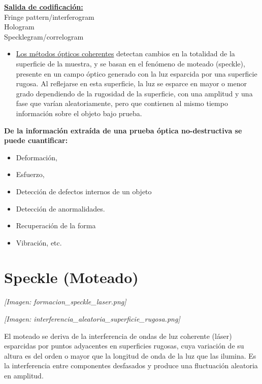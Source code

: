 \documentclass[12pt]{article}
\begin{document}
	\underline{\textbf{Salida de codificación:}} \\
	Fringe pattern/interferogram \\
	Hologram \\
	Specklegram/correlogram
	
	\colorbox{gray!20}{\parbox{\textwidth}{
			\begin{itemize}
				\item \underline{Los métodos ópticos coherentes} detectan cambios en la totalidad de la superficie de la muestra, y se basan en el fenómeno de moteado (speckle), presente en un campo óptico generado con la luz esparcida por una superficie rugosa. Al reflejarse en esta superficie, la luz se esparce en mayor o menor grado dependiendo de la rugosidad de la superficie, con una amplitud y una fase que varían aleatoriamente, pero que contienen al mismo tiempo información sobre el objeto bajo prueba.
			\end{itemize}
	}}
	
	\vspace{0.5cm}
	\colorbox{olive!40}{\parbox{\textwidth}{
			\textbf{De la información extraída de una prueba óptica no-destructiva se puede cuantificar:}
			\begin{itemize}
				\item[$\square$] Deformación,
				\item[$\square$] Esfuerzo,
				\item[$\square$] Detección de defectos internos de un objeto
				\item[$\square$] Detección de anormalidades.
				\item[$\square$] Recuperación de la forma
				\item[$\square$] Vibración, etc.
			\end{itemize}
	}}
	
	\section{Speckle (Moteado)}
	\begin{minipage}{0.45\textwidth}
		\textit{[Imagen: formacion\_speckle\_laser.png]}
	\end{minipage}
	\hfill
	\begin{minipage}{0.45\textwidth}
		\textit{[Imagen: interferencia\_aleatoria\_superficie\_rugosa.png]}
	\end{minipage}
	
	\vspace{0.5cm}
	El moteado se deriva de la interferencia de ondas de luz coherente (láser) esparcidas por puntos adyacentes en superficies rugosas, cuya variación de su altura es del orden o mayor que la longitud de onda de la luz que las ilumina. Es la interferencia entre componentes desfasados y produce una fluctuación aleatoria en amplitud.
	
\end{document}
